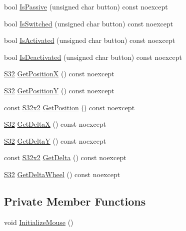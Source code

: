 \begin{DoxyCompactItemize}
\item 
bool \mbox{\hyperlink{classmage_1_1input_1_1_mouse_afcee4f0ee845d46b71fbc8a29879b873}{Is\+Passive}} (unsigned char button) const noexcept
\item 
bool \mbox{\hyperlink{classmage_1_1input_1_1_mouse_a1c4d91c2aa67ea7fa5f899011890d279}{Is\+Switched}} (unsigned char button) const noexcept
\item 
bool \mbox{\hyperlink{classmage_1_1input_1_1_mouse_abc5d4a21e21865202c01993fc093977f}{Is\+Activated}} (unsigned char button) const noexcept
\item 
bool \mbox{\hyperlink{classmage_1_1input_1_1_mouse_acd07880cd7af2afa704de7500a64eb3c}{Is\+Deactivated}} (unsigned char button) const noexcept
\item 
\mbox{\hyperlink{namespacemage_a2ef1a005a77358f1825d13fd481b557f}{S32}} \mbox{\hyperlink{classmage_1_1input_1_1_mouse_a208f26babea7ac6e07af5f79600e22ae}{Get\+PositionX}} () const noexcept
\item 
\mbox{\hyperlink{namespacemage_a2ef1a005a77358f1825d13fd481b557f}{S32}} \mbox{\hyperlink{classmage_1_1input_1_1_mouse_a81bf0ebd5fb34a25ba9f5d4c7aea1ed6}{Get\+PositionY}} () const noexcept
\item 
const \mbox{\hyperlink{namespacemage_a4843c424aae7bb5fb6c440ed6ed593ee}{S32x2}} \mbox{\hyperlink{classmage_1_1input_1_1_mouse_a8127f78dd1fb1eba29c3888d40db97da}{Get\+Position}} () const noexcept
\item 
\mbox{\hyperlink{namespacemage_a2ef1a005a77358f1825d13fd481b557f}{S32}} \mbox{\hyperlink{classmage_1_1input_1_1_mouse_ac15719c468a94885a256e34b27cf2ca5}{Get\+DeltaX}} () const noexcept
\item 
\mbox{\hyperlink{namespacemage_a2ef1a005a77358f1825d13fd481b557f}{S32}} \mbox{\hyperlink{classmage_1_1input_1_1_mouse_a448886ed21c136f1a385101e21093aa3}{Get\+DeltaY}} () const noexcept
\item 
const \mbox{\hyperlink{namespacemage_a4843c424aae7bb5fb6c440ed6ed593ee}{S32x2}} \mbox{\hyperlink{classmage_1_1input_1_1_mouse_a6f789e976d80c6f9c92388e3cf3502d6}{Get\+Delta}} () const noexcept
\item 
\mbox{\hyperlink{namespacemage_a2ef1a005a77358f1825d13fd481b557f}{S32}} \mbox{\hyperlink{classmage_1_1input_1_1_mouse_a71d088496a46d2915eb3fb8ba7dbb8e5}{Get\+Delta\+Wheel}} () const noexcept
\end{DoxyCompactItemize}
\subsection*{Private Member Functions}
\begin{DoxyCompactItemize}
\item 
void \mbox{\hyperlink{classmage_1_1input_1_1_mouse_a8209bbaf255c2e93ee1cd8f3937cd8ab}{Initialize\+Mouse}} ()
\end{DoxyCompactItemize}
